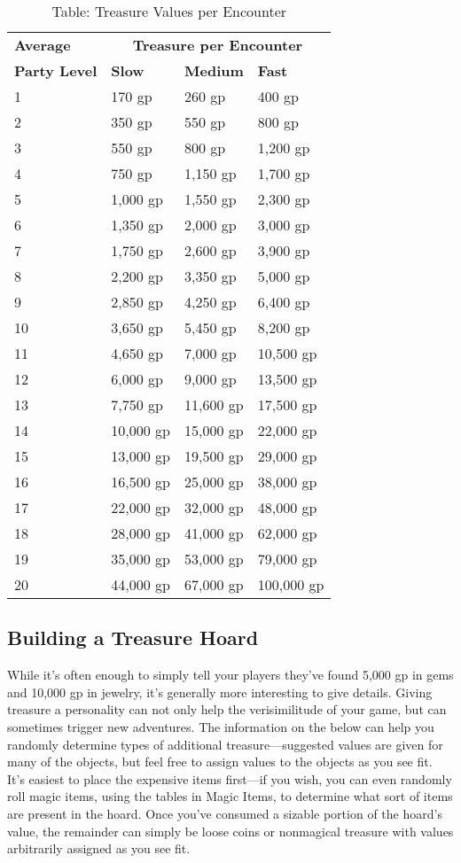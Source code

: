 \begin{table}[]
\sffamily
\caption{Table: Treasure Values per Encounter}
\begin{tabular}{llll}
 \textbf {Average}   & \multicolumn{3}{c}{\textbf{Treasure per Encounter}}\\
\textbf{Party Level} & \textbf{Slow} & \textbf{Medium} & \textbf{Fast}\\
1 & 170 gp & 260 gp & 400 gp \\
 2 & 350 gp & 550 gp & 800 gp \\
 3 & 550 gp & 800 gp & 1,200 gp \\
 4 & 750 gp & 1,150 gp & 1,700 gp \\
 5 & 1,000 gp & 1,550 gp & 2,300 gp \\
 6 & 1,350 gp & 2,000 gp & 3,000 gp \\
 7 & 1,750 gp & 2,600 gp & 3,900 gp \\
 8 & 2,200 gp & 3,350 gp & 5,000 gp \\
 9 & 2,850 gp & 4,250 gp & 6,400 gp \\
 10 & 3,650 gp & 5,450 gp & 8,200 gp \\
 11 & 4,650 gp & 7,000 gp & 10,500 gp \\
 12 & 6,000 gp & 9,000 gp & 13,500 gp \\
 13 & 7,750 gp & 11,600 gp & 17,500 gp \\
 14 & 10,000 gp & 15,000 gp & 22,000 gp \\
 15 & 13,000 gp & 19,500 gp & 29,000 gp \\
 16 & 16,500 gp & 25,000 gp & 38,000 gp \\
 17 & 22,000 gp & 32,000 gp & 48,000 gp \\
 18 & 28,000 gp & 41,000 gp & 62,000 gp \\
 19 & 35,000 gp & 53,000 gp & 79,000 gp \\
 20 & 44,000 gp & 67,000 gp & 100,000 gp\\
\end{tabular}
\end{table}
\subsection{Building a Treasure Hoard}

				
While it's often enough to simply tell your players they've found 5,000 gp in gems and 10,000 gp in jewelry, it's generally more interesting to give details. Giving treasure a personality can not only help the verisimilitude of your game, but can sometimes trigger new adventures. The information on the below can help you randomly determine types of additional treasure---suggested values are given for many of the objects, but feel free to assign values to the objects as you see fit. It's easiest to place the expensive items first---if you wish, you can even randomly roll magic items, using the tables in Magic Items, to determine what sort of items are present in the hoard. Once you've consumed a sizable portion of the hoard's value, the remainder can simply be loose coins or nonmagical treasure with values arbitrarily assigned as you see fit.
				
